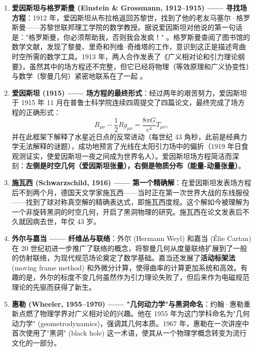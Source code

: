 \begin{enumerate}
    \item \textbf{爱因斯坦与格罗斯曼 (Einstein \& Grossmann, 1912--1915) —— 寻找场方程}：1912 年，爱因斯坦从布拉格返回苏黎世，找到了他的老友马塞尔·格罗斯曼——苏黎世联邦理工学院的数学教授。据说爱因斯坦对他说的第一句话是："格罗斯曼，你必须帮助我，否则我会发疯！" \cite{Wald2019}。格罗斯曼查阅了图书馆的数学文献，发现了黎曼、里奇和列维--奇维塔的工作，意识到这正是描述弯曲时空所需的数学工具。1913 年，两人合作发表了《广义相对论和引力理论纲要》，虽然其中的场方程还不完整，但它已经将物理（等效原理和广义协变性）与数学（黎曼几何）紧密地联系在了一起 \cite{Tong_GR_LectureNotes}。
    
    \item \textbf{爱因斯坦 (1915) —— 场方程的最终形式}：经过两年的艰苦努力，爱因斯坦于 1915 年 11 月在普鲁士科学院连续四周提交了四篇论文，最终完成了场方程的正确形式：
    \begin{equation}
        R_{\mu\nu} - \frac{1}{2}R g_{\mu\nu} = \frac{8\pi G}{c^4} T_{\mu\nu},
    \end{equation}
    并在此框架下解释了水星近日点的反常进动（每世纪 43 角秒，此前是经典力学无法解释的谜题），成功地预言了光线在太阳引力场中的偏折（1919 年日食观测证实，使爱因斯坦一夜之间成为世界名人）。爱因斯坦场方程简洁而深刻：\textbf{左侧是时空几何（爱因斯坦张量），右侧是物质分布（能量-动量张量）}。
    
    \item \textbf{施瓦西 (Schwarzschild, 1916) —— 第一个精确解}：在爱因斯坦发表场方程后不到两个月，德国天文学家施瓦西——当时正在第一次世界大战的东线服役——找到了球对称真空解的精确表达式，即施瓦西度规。这个解如今被理解为一个非旋转黑洞的时空几何，开启了黑洞物理的研究。施瓦西在论文发表后不久就因病去世，年仅 43 岁。
    
    \item \textbf{外尔与嘉当 —— 纤维丛与联络}：外尔 (Hermann Weyl) 和嘉当 (Élie Cartan) 在 20 世纪初进一步推广了联络的概念，将黎曼几何从度量联络扩展到了一般的仿射联络，为现代规范场论奠定了数学基础。嘉当还发展了\textbf{活动标架法} (moving frame method) 和外微分计算，使得曲率的计算更加系统和高效。有趣的是，外尔的标度不变几何虽然作为引力理论失败了，但后来作为电磁规范理论的先驱而获得了新生。
    
    \item \textbf{惠勒 (Wheeler, 1955--1970) —— "几何动力学"与黑洞命名}：约翰·惠勒重新点燃了物理学界对广义相对论的兴趣。他在 1955 年为这门学科命名为"几何动力学" (geometrodynamics)，强调其几何本质。1967 年，惠勒在一次讲座中首次使用了"黑洞" (black hole) 这一术语，使其从一个物理学概念转变为流行文化的一部分。
    

\end{enumerate}
